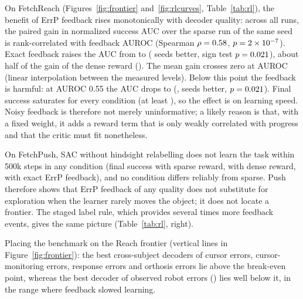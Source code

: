 On FetchReach (Figures~\ref{fig:frontier} and~\ref{fig:rlcurves}, Table~\ref{tab:rl}), the benefit of ErrP feedback rises
monotonically with decoder quality: across all runs, the paired gain in normalized success AUC over the sparse
run of the same seed is rank-correlated with feedback AUROC (Spearman $\rho=0.58{}$, $p=2\times10^{-7}{}$).
Exact feedback raises the AUC from \RLAUCReachSparse{} to \RLAUCReachExact{} (\RLPosReachExact{} seeds better,
sign test $p=0.021{}$), about half of the gain of the dense reward (\RLAUCReachDense{}). The mean gain
crosses zero at AUROC \RLBreakEvenReach{} (linear interpolation between the measured levels). Below this point the
feedback is harmful: at AUROC 0.55 the AUC drops to \RLAUCReachLow{} (\RLGainReachLow{}, \RLPosReachLow{} seeds
better, $p=0.021{}$). Final success saturates for every condition (at least \RLSuccReachLow{}), so the
effect is on learning speed. Noisy feedback is therefore not merely uninformative; a likely reason is that, with a
fixed weight, it adds a reward term that is only weakly correlated with progress and that the critic must
fit nonetheless.

On FetchPush, SAC without hindsight relabelling does not learn the task within 500k steps in any condition
(final success \RLSuccPushSparse{} with sparse reward, \RLSuccPushDense{} with dense reward,
\RLSuccPushExact{} with exact ErrP feedback), and no condition differs reliably from sparse. Push therefore shows
that ErrP feedback of any quality does not substitute for exploration when the learner rarely moves the object;
it does not locate a frontier. The staged label rule, which provides several times more feedback events, gives
the same picture (Table~\ref{tab:rl}, right).

Placing the benchmark on the Reach frontier (vertical lines in Figure~\ref{fig:frontier}): the best
cross-subject decoders of cursor errors, cursor-monitoring errors, response errors and orthosis errors lie above
the break-even point, whereas the best decoder of observed robot errors (\BestErrpHriRobot{}) lies well below
it, in the range where feedback slowed learning.
